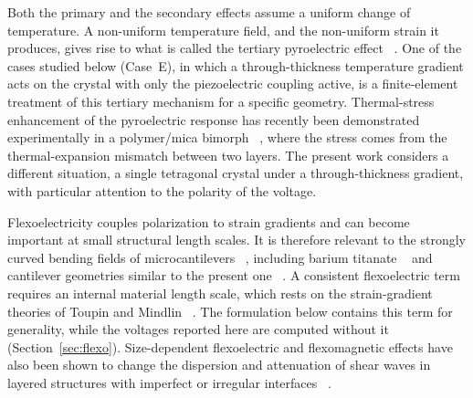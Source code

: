 \documentclass[pdflatex,sn-mathphys-num]{sn-jnl}
\begin{document}
Both the primary and the secondary effects assume a uniform change of temperature. A
non-uniform temperature field, and the non-uniform strain it produces, gives rise to
what is called the tertiary pyroelectric effect ~\cite{Lang2005Pyro}. One of the cases
studied below (Case~E), in which a through-thickness temperature gradient acts on the
crystal with only the piezoelectric coupling active, is a finite-element treatment of
this tertiary mechanism for a specific geometry. Thermal-stress enhancement of the
pyroelectric response has recently been demonstrated experimentally in a polymer/mica
bimorph ~\cite{Su2026ThermalStressPyro}, where the stress comes from the
thermal-expansion mismatch between two layers. The present work considers a different
situation, a single tetragonal crystal under a through-thickness gradient, with
particular attention to the polarity of the voltage.

Flexoelectricity couples polarization to strain gradients and can become important
at small structural length scales. It is therefore
relevant to the strongly curved bending fields of microcantilevers
~\cite{Tagantsev1986,Cross2006,Zubko2013}, including barium titanate ~\cite{MaCross2006}
and cantilever geometries similar to the present one
~\cite{Huang2007,Mao2016,Abdollahi2014}. A consistent flexoelectric term requires an
internal material length scale, which rests on the strain-gradient theories of Toupin
and Mindlin ~\cite{Toupin1962,Mindlin1964,MindlinEshel1968}. The formulation below
contains this term for generality, while the voltages reported here are computed
without it (Section~\ref{sec:flexo}). Size-dependent flexoelectric and flexomagnetic
effects have also been shown to change the dispersion and attenuation of shear waves in
layered structures with imperfect or irregular interfaces
~\cite{Meghana2025,Gupta2026AMM}.
\end{document}
